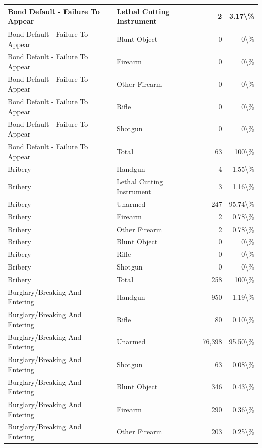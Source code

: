 \documentclass[
]{krantz}
\begin{document}
\begin{longtable}[t]{l|l|r|r}
\hline
Bond Default - Failure To Appear & Lethal Cutting Instrument & 2 & 3.17\textbackslash{}\%\\
\hline
Bond Default - Failure To Appear & Blunt Object & 0 & 0\textbackslash{}\%\\
\hline
Bond Default - Failure To Appear & Firearm & 0 & 0\textbackslash{}\%\\
\hline
Bond Default - Failure To Appear & Other Firearm & 0 & 0\textbackslash{}\%\\
\hline
Bond Default - Failure To Appear & Rifle & 0 & 0\textbackslash{}\%\\
\hline
Bond Default - Failure To Appear & Shotgun & 0 & 0\textbackslash{}\%\\
\hline
Bond Default - Failure To Appear & Total & 63 & 100\textbackslash{}\%\\
\hline
Bribery & Handgun & 4 & 1.55\textbackslash{}\%\\
\hline
Bribery & Lethal Cutting Instrument & 3 & 1.16\textbackslash{}\%\\
\hline
Bribery & Unarmed & 247 & 95.74\textbackslash{}\%\\
\hline
Bribery & Firearm & 2 & 0.78\textbackslash{}\%\\
\hline
Bribery & Other Firearm & 2 & 0.78\textbackslash{}\%\\
\hline
Bribery & Blunt Object & 0 & 0\textbackslash{}\%\\
\hline
Bribery & Rifle & 0 & 0\textbackslash{}\%\\
\hline
Bribery & Shotgun & 0 & 0\textbackslash{}\%\\
\hline
Bribery & Total & 258 & 100\textbackslash{}\%\\
\hline
Burglary/Breaking And Entering & Handgun & 950 & 1.19\textbackslash{}\%\\
\hline
Burglary/Breaking And Entering & Rifle & 80 & 0.10\textbackslash{}\%\\
\hline
Burglary/Breaking And Entering & Unarmed & 76,398 & 95.50\textbackslash{}\%\\
\hline
Burglary/Breaking And Entering & Shotgun & 63 & 0.08\textbackslash{}\%\\
\hline
Burglary/Breaking And Entering & Blunt Object & 346 & 0.43\textbackslash{}\%\\
\hline
Burglary/Breaking And Entering & Firearm & 290 & 0.36\textbackslash{}\%\\
\hline
Burglary/Breaking And Entering & Other Firearm & 203 & 0.25\textbackslash{}\%\\
\hline

\end{longtable}
\end{document}
